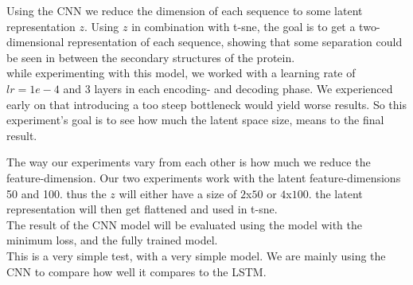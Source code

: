 Using the CNN we reduce the dimension of each sequence to some latent representation $z$. Using $z$ in combination with t-sne, the goal is to get a two-dimensional representation of each sequence, showing that some separation could be seen in between the secondary structures of the protein. \\

\noindent
while experimenting with this model, we worked with a learning rate of $lr=1e-4$ and 3 layers in each encoding- and decoding phase. We experienced early on that introducing a too steep bottleneck would yield worse results. So this experiment's goal is to see how much the latent space size, means to the final result.

\noindent
The way our experiments vary from each other is how much we reduce the feature-dimension. Our two experiments work with the latent feature-dimensions 50 and 100. thus the $z$ will either have a size of $2$x$50$ or $4$x$100$. the latent representation will then get flattened and used in t-sne. \\

\noindent
The result of the CNN model will be evaluated using the model with the minimum loss, and the fully trained model. \\

\noindent
This is a very simple test, with a very simple model. We are mainly using the CNN to compare how well it compares to the LSTM.